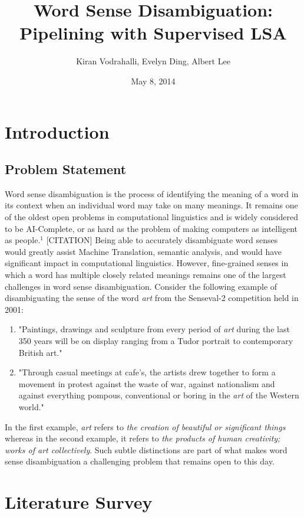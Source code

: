 \documentclass[10pt, letterpaper]{article}
\author{Kiran Vodrahalli, Evelyn Ding, Albert Lee}
\title{Word Sense Disambiguation: Pipelining with Supervised LSA}
\date{May 8, 2014}
\begin{document}
	\maketitle
	
	\section{Introduction}
	\subsection{Problem Statement}
	Word sense disambiguation is the process of identifying the meaning of a word in its context when an individual word may take on many meanings.
	It remains one of the oldest open problems in computational linguistics and is widely considered to be AI-Complete, 
	or as hard as the problem of making computers as intelligent as people.$^1$ [CITATION] Being able to accurately disambiguate word senses would greatly
	assist Machine Translation, semantic analysis, and would have significant impact in computational linguistics. However, fine-grained senses
	in which a word has multiple closely related meanings remains one of the largest challenges in word sense disambiguation. Consider the following
	example of disambiguating the sense of the word {\emph {art}} from the Senseval-2 competition held in 2001:
	\begin{enumerate}
	\item "Paintings, drawings and sculpture from every period of {\emph {art}} during the last 350 years will be on display ranging from a Tudor portrait to contemporary British art."
	\item "Through casual meetings at cafe's, the artists drew together to form a movement in protest against the waste of war, against nationalism and against everything pompous, conventional or boring in the {\emph {art}} of the Western world."
	\end{enumerate}
	In the first example, {\emph {art}} refers to {\emph {the creation of beautiful or significant things}} whereas in the second example, it refers to {\emph {the products of human creativity; works of art collectively}}. Such subtle distinctions are part of what makes word sense disambiguation a challenging problem that remains open to this day.
	\section{Literature Survey}
        
\end{document}
